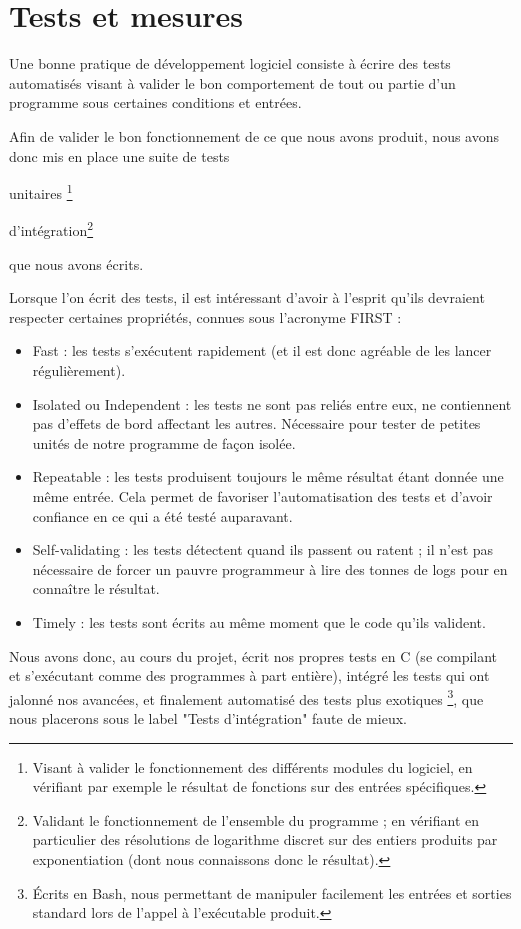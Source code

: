    \section{Tests et mesures}
      Une bonne pratique de développement logiciel consiste à écrire des tests automatisés visant à valider le bon comportement de tout ou partie d'un programme sous certaines conditions et entrées.

      Afin de valider le bon fonctionnement de ce que nous avons produit, nous avons donc mis en place une suite de tests
      \begin{enumerate*}
        \item unitaires \footnote{Visant à valider le fonctionnement des différents modules du logiciel, en vérifiant par exemple le résultat de fonctions sur des entrées spécifiques.}
        \item d'intégration\footnote{Validant le fonctionnement de l'ensemble du programme ; en vérifiant en particulier des résolutions de logarithme discret sur des entiers produits par exponentiation (dont nous connaissons donc le résultat).}
      \end{enumerate*}
      que nous avons écrits.

      Lorsque l'on écrit des tests, il est intéressant d'avoir à l'esprit qu'ils devraient respecter certaines propriétés, connues sous l'acronyme FIRST :
      \begin{itemize}
        \item Fast : les tests s'exécutent rapidement (et il est donc agréable de les lancer régulièrement).
        \item Isolated ou Independent : les tests ne sont pas reliés entre eux, ne contiennent pas d'effets de bord affectant les autres. Nécessaire pour tester de petites unités de notre programme de façon isolée.
        \item Repeatable : les tests produisent toujours le même résultat étant donnée une même entrée. Cela permet de favoriser l'automatisation des tests et d'avoir confiance en ce qui a été testé auparavant.
        \item Self-validating : les tests détectent quand ils passent ou ratent ; il n'est pas nécessaire de forcer un pauvre programmeur à lire des tonnes de logs pour en connaître le résultat.
        \item Timely : les tests sont écrits au même moment que le code qu'ils valident.
      \end{itemize}

      Nous avons donc, au cours du projet, écrit nos propres tests en C (se compilant et s'exécutant comme des programmes à part entière), intégré les tests qui ont jalonné nos avancées, et finalement automatisé des tests plus exotiques \footnote{Écrits en Bash, nous permettant de manipuler facilement les entrées et sorties standard lors de l'appel à l'exécutable produit.}, que nous placerons sous le label "Tests d'intégration" faute de mieux.

